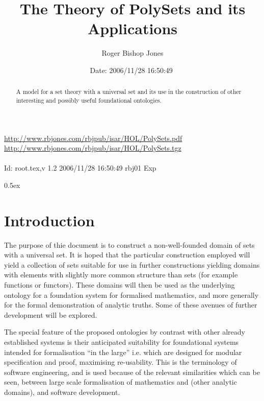 \documentclass[11pt,a4paper]{article}
\begin{document}
\title{The Theory of PolySets and its Applications}

\author{Roger Bishop Jones}
\date{$ $Date: 2006/11/28 16:50:49 $ $}
\maketitle

\begin{abstract}
A model for a set theory with a universal set and its use in the construction of other interesting and possibly useful foundational ontologies.
\end{abstract}

\vfill
\begin{centering}
{\footnotesize
\href{http://www.rbjones.com/rbjpub/isar/HOL/PolySets.pdf}{http://www.rbjones.com/rbjpub/isar/HOL/PolySets.pdf}\\
\href{http://www.rbjones.com/rbjpub/isar/HOL/PolySets.tgz}{http://www.rbjones.com/rbjpub/isar/HOL/PolySets.tgz}\\
\ \\
$ $Id: root.tex,v 1.2 2006/11/28 16:50:49 rbj01 Exp $ $\\
}%
\end{centering}

\newpage

\tableofcontents

\parindent 0pt\parskip 0.5ex
\newpage
\section{Introduction}

The purpose of thie document is to construct a non-well-founded domain of sets with a universal set.
It is hoped that the particular construction employed will yield a collection of sets suitable for use in further constructions yielding domains with elements with slightly more common structure than sets (for example functions or functors).
These domains will then be used as the underlying ontology for a foundation system for formalised mathematics, and more generally for the formal demonstration of analytic truths.
Some of these avenues of further development will be explored.

The special feature of the proposed ontologies by contrast with other already established systems is their anticipated suitability for foundational systems intended for formalisation ``in the large'' i.e. which are designed for modular specification and proof, maximising re-usability.
This is the terminology of software engineering, and is used because of the relevant similarities which can be seen, between large scale formalisation of mathematics and (other analytic domains), and software development.
\end{document}
